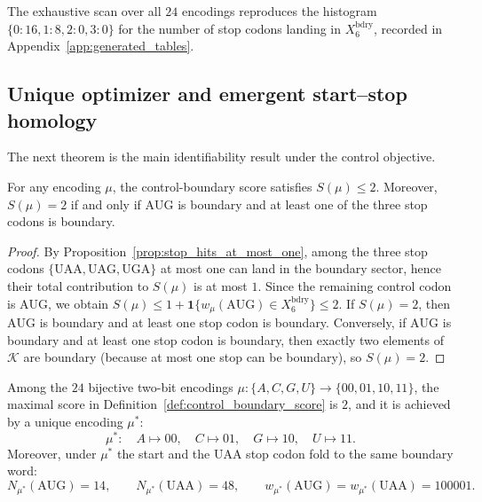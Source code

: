 \begin{remark}
The exhaustive scan over all $24$ encodings reproduces the histogram $\{0:16,1:8,2:0,3:0\}$ for the number of stop codons landing in $X_6^{\mathrm{bdry}}$, recorded in Appendix~\ref{app:generated_tables}.
\end{remark}

\subsection{Unique optimizer and emergent start--stop homology}
\label{sec:uniqueness}

The next theorem is the main identifiability result under the control objective.

\begin{lemma}
\label{lem:control_score_upper_bound}
For any encoding $\mu$, the control-boundary score satisfies $S(\mu)\le 2$.
Moreover, $S(\mu)=2$ if and only if $\mathrm{AUG}$ is boundary and at least one of the three stop codons is boundary.
\end{lemma}

\begin{proof}
By Proposition~\ref{prop:stop_hits_at_most_one}, among the three stop codons $\{\mathrm{UAA,UAG,UGA}\}$ at most one can land in the boundary sector, hence their total contribution to $S(\mu)$ is at most $1$.
Since the remaining control codon is $\mathrm{AUG}$, we obtain $S(\mu)\le 1+\mathbf{1}\{w_\mu(\mathrm{AUG})\in X_6^{\mathrm{bdry}}\}\le 2$.
If $S(\mu)=2$, then $\mathrm{AUG}$ is boundary and at least one stop codon is boundary.
Conversely, if $\mathrm{AUG}$ is boundary and at least one stop codon is boundary, then exactly two elements of $\mathcal{K}$ are boundary (because at most one stop can be boundary), so $S(\mu)=2$.
\end{proof}

\begin{theorem}
\label{thm:unique_encoding}
Among the $24$ bijective two-bit encodings $\mu:\{A,C,G,U\}\to\{00,01,10,11\}$, the maximal score in Definition~\ref{def:control_boundary_score} is $2$, and it is achieved by a unique encoding $\mu^\ast$:
\[
\mu^\ast:\quad A\mapsto 00,\quad C\mapsto 01,\quad G\mapsto 10,\quad U\mapsto 11.
\]
Moreover, under $\mu^\ast$ the start and the $\mathrm{UAA}$ stop codon fold to the same boundary word:
\[
N_{\mu^\ast}(\mathrm{AUG})=14,\qquad N_{\mu^\ast}(\mathrm{UAA})=48,
\qquad
w_{\mu^\ast}(\mathrm{AUG})=w_{\mu^\ast}(\mathrm{UAA})=100001.
\]
\end{theorem}


